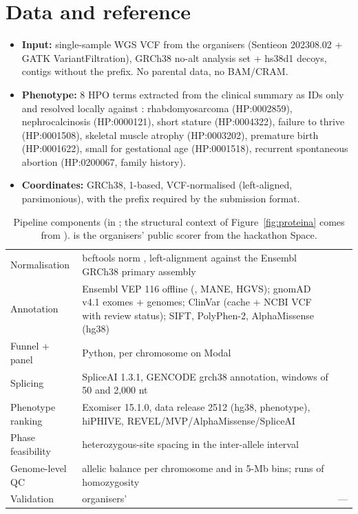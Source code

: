 \documentclass[10pt]{article}
\begin{document}
\section{Data and reference}

\begin{itemize}
\item \textbf{Input:} single-sample WGS VCF from the organisers (Sentieon 202308.02 + GATK VariantFiltration), GRCh38
  no-alt analysis set + hs38d1 decoys, contigs without the  prefix. No parental data, no BAM/CRAM.
\item \textbf{Phenotype:} 8 HPO terms extracted from the clinical summary as IDs only and resolved locally against
  : rhabdomyosarcoma (HP:0002859), nephrocalcinosis (HP:0000121), short stature (HP:0004322), failure to
  thrive (HP:0001508), skeletal muscle atrophy (HP:0003202), premature birth (HP:0001622), small for gestational age
  (HP:0001518), recurrent spontaneous abortion (HP:0200067, family history).
\item \textbf{Coordinates:} GRCh38, 1-based, VCF-normalised (left-aligned, parsimonious), with the  prefix
  required by the submission format.
\end{itemize}

\begin{table}[H]
\tablefont
\begin{tabularx}{\linewidth}{@{}P{2.7cm}LP{2.75cm}@{}}
\toprule
{} &  &  \\
\midrule
Normalisation & bcftools norm , left-alignment against the Ensembl GRCh38 primary assembly &  \\
Annotation & Ensembl VEP 116 offline (, MANE, HGVS); gnomAD v4.1 exomes + genomes; ClinVar (cache + NCBI VCF with review status); SIFT, PolyPhen-2, AlphaMissense (hg38) &  \\
Funnel + panel & Python, per chromosome on Modal &  \\
Splicing & SpliceAI 1.3.1, GENCODE grch38 annotation, windows of 50 and 2,000 nt &  \\
Phenotype ranking & Exomiser 15.1.0, data release 2512 (hg38, phenotype), hiPHIVE, REVEL/MVP/AlphaMissense/SpliceAI &  \\
Phase feasibility & heterozygous-site spacing in the inter-allele interval &  \\
Genome-level QC & allelic balance per chromosome and in 5-Mb bins; runs of homozygosity &  \\
Validation & organisers'  & — \\
\bottomrule
\end{tabularx}
\caption{Pipeline components (in ; the structural context of Figure~\ref{fig:proteina} comes from
).  is the organisers' public scorer from the hackathon Space.}
\end{table}
\end{document}
